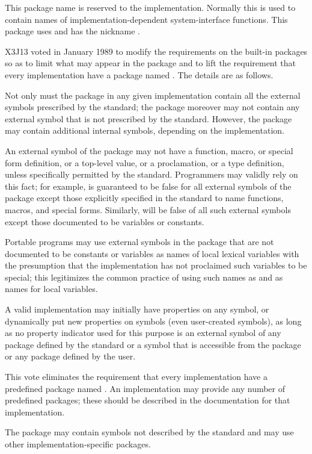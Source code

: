 \begin{obsolete}
\begin{flushdesc}
\item[\cdf{system}]
This package name is reserved to the implementation.
Normally this is used to contain names of implementation-dependent
system-interface functions.  This package uses  and has the
nickname . 
\end{flushdesc}
\end{obsolete}

\begin{new}
X3J13 voted in January 1989
to modify the requirements on the built-in packages
so as to limit what may appear in the  package
and to lift the requirement that every implementation have a package
named .  The details are as follows.

Not only must the  package in any given implementation
contain all the external symbols prescribed by the standard;
the  package moreover may not contain any external symbol
that is not prescribed by the standard.  However, the 
package may contain additional internal symbols, depending on the
implementation.

An external symbol of the  package may not have a function,
macro, or special form definition, or a top-level value,
or a  proclamation, or a type definition, unless specifically
permitted by the standard.  Programmers may validly rely on this fact;
for example,  is guaranteed to be false for all
external symbols of the  package except those explicitly
specified in the standard to name functions, macros, and special forms.
Similarly,  will be false of all such external symbols
except those documented to be variables or constants.

Portable programs
may use external symbols in the  package that are not documented
to be constants or variables as names of local lexical
variables with the presumption that the implementation has not
proclaimed such variables to be special; this legitimizes the common
practice of using such names as  and  as names
for local variables.

A valid implementation may initially have properties on any symbol,
or dynamically put new properties on symbols (even user-created symbols),
as long as no property indicator used for this purpose is
an external symbol of any package defined by the standard
or a symbol that is accessible from the  package or any
package defined by the user.

This vote eliminates the requirement that every implementation have
a predefined package named .  An implementation may
provide any number of predefined packages; these should be described
in the documentation for that implementation.

The  package may contain symbols not described by the standard
and may use other implementation-specific packages.
\end{new}

